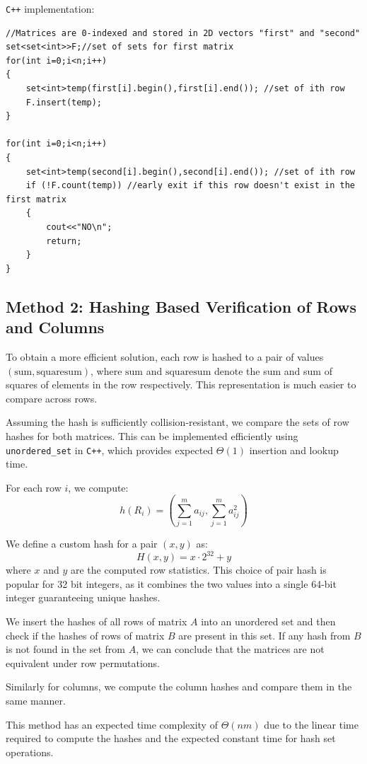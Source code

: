 \documentclass[11pt,openany]{book}
\begin{document}
\noindent \texttt{C++} implementation:
\begin{verbatim}
//Matrices are 0-indexed and stored in 2D vectors "first" and "second"
set<set<int>>F;//set of sets for first matrix
for(int i=0;i<n;i++)
{
    set<int>temp(first[i].begin(),first[i].end()); //set of ith row
    F.insert(temp);
}

for(int i=0;i<n;i++)
{
    set<int>temp(second[i].begin(),second[i].end()); //set of ith row
    if (!F.count(temp)) //early exit if this row doesn't exist in the first matrix
    {
        cout<<"NO\n";
        return;
    }
}
\end{verbatim}

\subsection[Hashing Method]{Method 2: Hashing Based Verification of Rows and Columns}

To obtain a more efficient solution, each row is hashed to a pair of values $(\text{sum}, \text{squaresum})$, where $\text{sum}$ and $\text{squaresum}$ denote the sum and sum of squares of elements in the row respectively. This representation is much easier to compare across rows.

Assuming the hash is sufficiently collision-resistant, we compare the sets of row hashes for both matrices. This can be implemented efficiently using \texttt{unordered\_set} in \texttt{C++}, which provides expected $\Theta(1)$ insertion and lookup time.

For each row $i$, we compute:
\[
h(R_i) = \left(\sum_{j=1}^{m} a_{ij}, \sum_{j=1}^{m} a_{ij}^2\right)
\]

We define a custom hash for a pair $(x,y)$ as:
\[
H(x,y) = x \cdot 2^{32} + y
\]
where $x$ and $y$ are the computed row statistics. This choice of pair hash is popular for 32 bit integers, as it combines the two values into a single 64-bit integer guaranteeing unique hashes.

We insert the hashes of all rows of matrix \(A\) into an unordered set and then check if the hashes of rows of matrix \(B\) are present in this set. If any hash from \(B\) is not found in the set from \(A\), we can conclude that the matrices are not equivalent under row permutations.

Similarly for columns, we compute the column hashes and compare them in the same manner.

This method has an expected time complexity of \(\Theta(nm)\) due to the linear time required to compute the hashes and the expected constant time for hash set operations.\\
\end{document}
